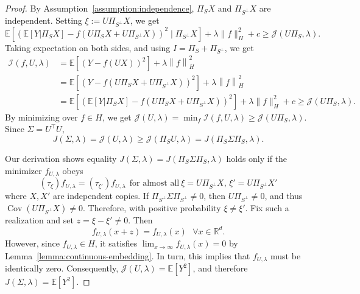 \documentclass[10pt,a4paper]{amsart}
\newcommand{\E}{\mathbb{E}}
\newcommand{\R}{\mathbb{R}}
\newcommand{\norm}[1]{\left\|{#1}\right\|} %
\begin{document}
\begin{proof}
By Assumption~\ref{assumption:independence}, $\Pi_{S} X$ and $\Pi_{S^\perp} X$ are independent. Setting $\xi := U \Pi_{S^\perp} X$, we get
\[
  \E\left[(\E[Y|\Pi_{S} X] - f(U \Pi_{S} X + U\Pi_{S^\perp} X))^2 \mid  \Pi_{S^\perp} X\right] + \lambda \|f\|_H^2 + c \ge \mathcal{J}(U\Pi_S, \lambda).
\]
Taking expectation on both sides, and using $I = \Pi_{S} + \Pi_{S^\perp}$, we get 
\begin{equation*}
\begin{split} 
	\mathcal{I}(f, U, \lambda) 
		&=  \E[(Y - f( U X))^2] + \lambda \norm{f}_H^2  \\
		&= \E[(Y - f( U \Pi_{S} X + U \Pi_{S^\perp} X))^2] + \lambda \norm{f}_H^2 \\
		&=   \E\left[(\E[Y|\Pi_{S} X] - f(U \Pi_{S} X + U \Pi_{S^\perp} X))^2\right] + \lambda \|f\|_H^2 + c 
			\ge  \mathcal{J}(U\Pi_S, \lambda).
\end{split} 
\end{equation*}
By minimizing over $f \in H$, we get 
$\mathcal{J}(U, \lambda)= \min_f \mathcal{I}(f, U, \lambda)  \ge \mathcal{J}(U\Pi_S, \lambda)$. 
Since $\Sigma = U^\top U$, 
\begin{equation*} J(\Sigma,\lambda) = \mathcal{J}(U,\lambda) \ge \mathcal{J}(\Pi_S U,\lambda)
  = J(\Pi_S \Sigma \Pi_S,\lambda).
 \end{equation*} 

Our derivation shows equality 
$J(\Sigma, \lambda) = J(\Pi_{S} \Sigma \Pi_S, \lambda)$ holds
only if the minimizer $f_{U, \lambda}$ obeys 
\begin{equation*}
(\tau_{\xi}) f_{U, \lambda} = (\tau_{\xi'}) f_{U, \lambda}~~\text{for almost all}~\xi= U\Pi_{S^\perp} X, \, \xi' = U\Pi_{S^\perp}X'
\end{equation*}
where $X, X'$ are independent copies. If $\Pi_{S^\perp}\Sigma\Pi_{S^\perp}\neq 0$, then $U\Pi_{S^\perp}\neq 0$, and thus $\operatorname{Cov}(U\Pi_{S^\perp}X)\neq 0$. Therefore, with positive probability $\xi\neq \xi'$. Fix such a realization and set $z=\xi-\xi'\neq 0$. Then
\begin{equation*}
	f_{U, \lambda}(x + z)  = f_{U, \lambda}(x)~~~\forall x\in \R^d.
\end{equation*}
However, since $f_{U, \lambda} \in H$, it satisfies $\lim_{x \to \infty} f_{U, \lambda}(x) = 0$ 
by Lemma~\ref{lemma:continuous-embedding}. In turn, this implies that $f_{U, \lambda}$ must be identically zero. 
Consequently, $\mathcal{J}(U, \lambda) = \E[Y^2]$, and therefore $J(\Sigma, \lambda) = \E[Y^2]$.
\end{proof} 
\end{document}
